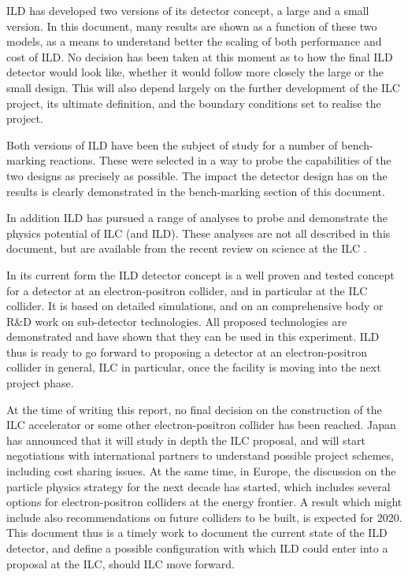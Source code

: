 ILD has developed two versions of its detector concept, a large and a small version. In this document, many results are shown as a function of these two models, as a means to understand better the scaling of both performance and cost of ILD. No decision has been taken at this moment as to how the final ILD detector would look like, whether it would follow more closely the large or the small design. This will also depend largely on the further development of the ILC project, its ultimate definition, and the boundary conditions set to realise the project. 

Both versions of ILD have been the subject of study for a number of bench-marking reactions. These were selected in a way to probe the capabilities of the two designs as precisely as possible. The impact the detector design has on the results is clearly demonstrated in the bench-marking section of this document. 

In addition ILD has pursued a range of analyses to probe and demonstrate the physics potential of ILC (and ILD). These analyses are not all described in this document, but are available from the recent review on science at the ILC \cite{ild:bib:ref-keisuke}.

In its current form the ILD detector concept is a well proven and tested concept for a detector at an electron-positron collider, and in particular at the ILC collider. It is based on detailed simulations, and on an comprehensive body or R\&D work on sub-detector technologies. All proposed technologies are demonstrated and have shown that they can be used in this experiment. ILD thus is ready to go forward to proposing a detector at an electron-positron collider in general, ILC in particular, once the facility is moving into the next project phase. 

At the time of writing this report, no final decision on the construction of the ILC accelerator or some other electron-positron collider has been reached. Japan has announced that it will study in depth the ILC proposal, and will start negotiations with international partners to understand possible project schemes, including cost sharing issues. At the same time, in Europe, the discussion on the particle physics strategy for the next decade has started, which includes several options for electron-positron colliders at the energy frontier. A result which might include also recommendations on future colliders to be built, is expected for 2020. This document thus is a timely work to document the current state of the ILD detector, and define a possible configuration with which ILD could enter into a proposal at the ILC, should ILC move forward. 




